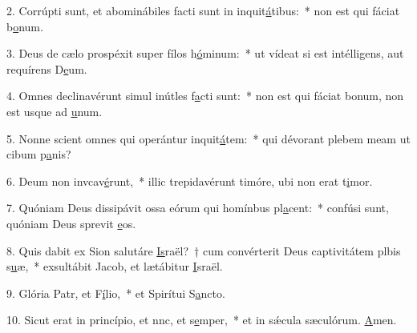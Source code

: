 2. Corrúpti sunt, et abominábiles facti sunt in inquit\uline{á}tibus:~* non est qui fáciat b\uline{o}num.\par 
3. Deus de cælo prospéxit super fílos h\uline{ó}minum:~* ut vídeat si est intélligens, aut requírens D\uline{e}um.\par 
4. Omnes declinavérunt simul inútles f\uline{a}cti sunt:~* non est qui fáciat bonum, non est usque ad \uline{u}num.\par 
5. Nonne scient omnes qui operántur inquit\uline{á}tem:~* qui dévorant plebem meam ut cibum p\uline{a}nis?\par 
6. Deum non invcav\uline{é}runt,~* illic trepidavérunt timóre, ubi non erat t\uline{i}mor.\par 
7. Quóniam Deus dissipávit ossa eórum qui homínbus pl\uline{a}cent:~* confúsi sunt, quóniam Deus sprevit \uline{e}os.\par 
8. Quis dabit ex Sion salutáre \uline{Is}raël?~† cum convérterit Deus captivitátem plbis s\uline{u}æ,~* exsultábit Jacob, et lætábitur \uline{I}sraël.\par 
9. Glória Patr, et F\uline{í}lio,~* et Spirítui S\uline{a}ncto.\par 
10. Sicut erat in princípio, et nnc, et s\uline{e}mper,~* et in sǽcula sæculórum. \uline{A}men.\par 
